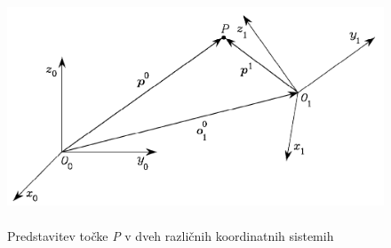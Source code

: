 \begin{figure}
	\centering
	\includegraphics[height=7cm]{./Slike/two-coordinates.png}
	\caption{Predstavitev to\v{c}ke \textit{P} v dveh razli\v{c}nih koordinatnih sistemih}
	\label{fig:twocoordinates}
\end{figure}
